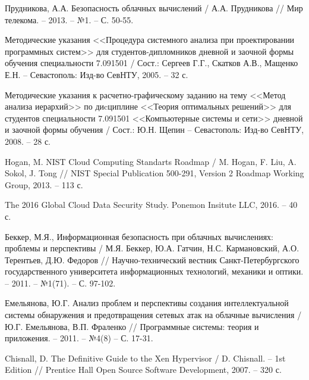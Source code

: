 \begingroup 
\renewcommand{\section}[2]{\anonsection{Библиографический список}}
\begin{thebibliography}{00}

    Прудникова, А.А.
    Безопасность облачных вычислений /
    А.А. Прудникова //
    Мир телекома. -- 2013. -- №1. -- С. 50-55.

    Методические указания <<Процедура системного анализа при проектировании программных систем>>
    для студентов-дипломников дневной и заочной формы обучения специальности 7.091501 /
    Сост.: Сергеев Г.Г., Скатков А.В., Мащенко Е.Н. -- Севастополь:
    Изд-во СевНТУ, 2005. -- 32 с.

    Методические указания к расчетно-графическому заданию
    на тему <<Метод анализа иерархий>>  по диcциплине <<Теория оптимальных решений>>
    для студентов специальности 7.091501 <<Компьютерные системы и сети>>
    дневной и заочной формы обучения /
    Сост.: Ю.Н. Щепин -- Севастополь:
    Изд-во СевНТУ, 2008. -- 28 с.

    Hogan, M.
    NIST Cloud Computing Standarts Roadmap /
    M. Hogan, F. Liu, A. Sokol, J. Tong //
    NIST Special Publication 500-291, Version 2
    Roadmap Working Group, 2013. -- 113 с.

    The 2016 Global Cloud Data Security Study.
    Ponemon Insitute LLC, 2016. -- 40 с.

    Беккер, М.Я.,
    Информационная безопасность при облачных вычислениях: проблемы и перспективы /
    М.Я. Беккер, Ю.А. Гатчин, Н.С. Кармановский, А.О. Терентьев, Д.Ю. Федоров //
    Научно-технический вестник Санкт-Петербургского государственного университета информационных технологий, механики и оптики. -- 2011. -- №1(71). -- С. 97-102.

    Емельянова, Ю.Г.
    Анализ проблем и перспективы создания интеллектуальной системы обнаружения и предотвращения сетевых атак на облачные вычисления /
    Ю.Г. Емельянова, В.П. Фраленко //
    Программные системы: теория и приложения. -- 2011. -- №4(8) -- С. 17-31.

    Chisnall, D.
    The Definitive Guide to the Xen Hypervisor /
    D. Chisnall. --
    1st Edition //
    Prentice Hall Open Source Software Development, 2007. -- 320 с.


\end{thebibliography}
